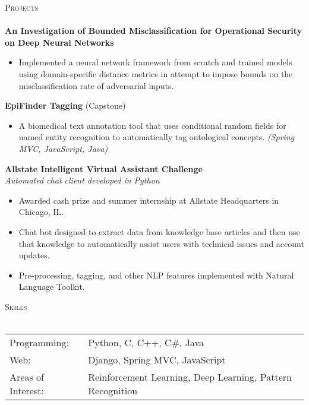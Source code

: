 \documentclass[a4paper]{article}
\newcommand{\lineunder} {
    \vspace*{-8pt} \\
    \hspace*{-18pt} \hrulefill \\
}
\newcommand{\header} [1] {
    {\hspace*{-18pt}\vspace*{6pt} \textsc{#1}}
    \vspace*{-6pt} \lineunder
}
\begin{document}
\header{Projects}
\textbf{An Investigation of Bounded Misclassification for Operational Security on Deep Neural Networks}
\begin{itemize}
    \item Implemented a neural network framework from scratch and trained models using domain-specific distance metrics in attempt to impose bounds on the misclassification rate of adversarial inputs.
\end{itemize}
\textbf{EpiFinder Tagging} (Capstone) \\
\begin{itemize}
       \item A biomedical text annotation tool that uses conditional random fields for named entity recognition to automatically tag ontological concepts. \textit {(Spring MVC, JavaScript, Java) }\\
\end{itemize}

\textbf{Allstate Intelligent Virtual Assistant Challenge} \\
    \textit{Automated chat client developed in Python}
    \begin{itemize}
        \item Awarded cash prize and summer internship at Allstate Headquarters in Chicago, IL.
        \item Chat bot designed to extract data from knowledge base articles and then use that knowledge to automatically assist users with technical issues and account updates.
        \item Pre-processing, tagging, and other NLP features implemented with Natural Language Toolkit.
        \end{itemize}
\vspace*{2mm}

\header{Skills}
\begin{tabular}{ l l }
	Programming: & Python, C, C++, C\#, Java                                                                      \\
	Web:         & Django, Spring MVC, JavaScript                                                                 \\
    Areas of Interest: & Reinforcement Learning, Deep Learning, Pattern Recognition
\end{tabular}
\end{document}
